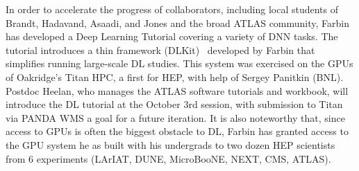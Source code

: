In order to accelerate the progress of collaborators, including local
students of Brandt, Hadavand, Asaadi, and Jones and the broad ATLAS
community, Farbin has developed a Deep Learning Tutorial covering a
variety of DNN tasks. The tutorial introduces a thin framework
(DLKit)~\cite{} developed by Farbin that simplifies running
large-scale DL studies. This system was exercised on the GPUs of
Oakridge's Titan HPC, a first for HEP, with help of Sergey Panitkin
(BNL). Postdoc Heelan, who manages the ATLAS software tutorials and
workbook, will introduce the DL tutorial at the October 3rd session,
with submission to Titan via PANDA WMS a goal for a future iteration.
It is also noteworthy that, since access to GPUs is often the biggest
obstacle to DL, Farbin has granted access to the GPU system he as
built with his undergrads to two dozen HEP scientists from 6 experiments
(LArIAT, DUNE, MicroBooNE, NEXT, CMS, ATLAS).





